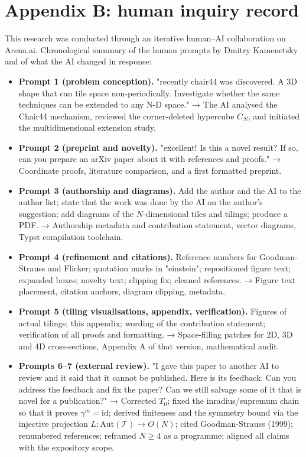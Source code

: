 \documentclass[11pt,a4paper]{article}
\theoremstyle{plain}
\theoremstyle{definition}
\begin{document}
\section*{Appendix B: human inquiry record}

This research was conducted through an iterative human--AI collaboration on Arena.ai. Chronological summary of the human prompts by Dmitry Kamenetsky and of what the AI changed in response:
\begin{itemize}
\item \textbf{Prompt 1 (problem conception).} "recently chair44 was discovered. A 3D shape that can tile space non-periodically. Investigate whether the same techniques can be extended to any N-D space." → The AI analysed the Chair44 mechanism, reviewed the corner-deleted hypercube $C_N$, and initiated the multidimensional extension study.
\item \textbf{Prompt 2 (preprint and novelty).} "excellent! Is this a novel result? If so, can you prepare an arXiv paper about it with references and proofs." → Coordinate proofs, literature comparison, and a first formatted preprint.
\item \textbf{Prompt 3 (authorship and diagrams).} Add the author and the AI to the author list; state that the work was done by the AI on the author's suggestion; add diagrams of the $N$-dimensional tiles and tilings; produce a PDF. → Authorship metadata and contribution statement, vector diagrams, Typst compilation toolchain.
\item \textbf{Prompt 4 (refinement and citations).} Reference numbers for Goodman-Strauss and Flicker; quotation marks in "einstein"; repositioned figure text; expanded boxes; novelty text; clipping fix; cleaned references. → Figure text placement, citation anchors, diagram clipping, metadata.
\item \textbf{Prompt 5 (tiling visualisations, appendix, verification).} Figures of actual tilings; this appendix; wording of the contribution statement; verification of all proofs and formatting. → Space-filling patches for 2D, 3D and 4D cross-sections, Appendix A of that version, mathematical audit.
\item \textbf{Prompts 6--7 (external review).} "I gave this paper to another AI to review and it said that it cannot be published. Here is its feedback. Can you address the feedback and fix the paper? Can we still salvage some of it that is novel for a publication?" → Corrected $T_0$; fixed the inradius/supremum chain so that it proves $\gamma^m = \mathrm{\mathrm{id}}$; derived finiteness and the symmetry bound via the injective projection $L : \mathrm{Aut}(\mathcal{T}) \to O(N)$; cited Goodman-Strauss (1999); renumbered references; reframed $N \ge  4$ as a programme; aligned all claims with the expository scope.

\end{itemize}
\end{document}
